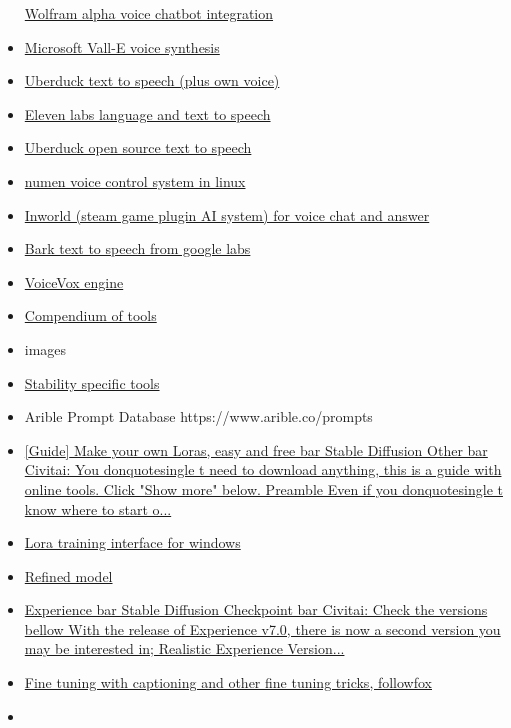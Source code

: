 \begin{itemize}
  \href{https://huggingface.co/spaces/JavaFXpert/Chat-GPT-LangChain}{Wolfram
  alpha voice chatbot integration}
\item
  \href{https://valle-demo.github.io/}{Microsoft Vall-E voice synthesis}
\item
  \href{https://app.uberduck.ai/}{Uberduck text to speech (plus own
  voice)}
\item
  \href{https://beta.elevenlabs.io/}{Eleven labs language and text to
  speech}
\item
  \href{https://uberduck.ai/}{Uberduck open source text to speech}
\item
  \href{https://numenvoice.com}{numen voice control system in linux}
\item
  \href{https://www.youtube.com/watch?v=DnF4WzM5LPU}{Inworld (steam game
  plugin AI system) for voice chat and answer}
\item
  \href{https://github.com/suno-ai/bark}{Bark text to speech from google
  labs}
\item
  \href{https://www.youtube.com/watch?v=TGZV831VTpc}{VoiceVox engine}
\item
  \href{https://www.futurepedia.io/}{Compendium of tools}
\item
  images
\item
  \href{https://sdtools.org/}{Stability specific tools}
\item
  Arible Prompt Database https://www.arible.co/prompts
\item
  \href{https://civitai.com/models/22530}{{[}Guide{]} Make your own
  Loras, easy and free bar{} Stable Diffusion Other bar{}
  Civitai: You donquotesingle t need to download anything, this is
  a guide with online tools. Click "Show more" below.   Preamble Even if
  you donquotesingle t know where to start o...}
\item
  \href{https://github.com/bmaltais/kohya_ss}{Lora training interface
  for windows}
\item
  \href{https://civitai.com/models/8392/refined}{Refined model}
\item
  \href{https://civitai.com/models/5952}{Experience bar{} Stable
  Diffusion Checkpoint bar{} Civitai: Check the versions bellow
  With the release of Experience v7.0, there is now a second version you
  may be interested in; Realistic Experience Version...}
\item
  \href{https://substack.com/profile/110613456-followfoxai}{Fine tuning
  with captioning and other fine tuning tricks, followfox}
\item

\end{itemize}
